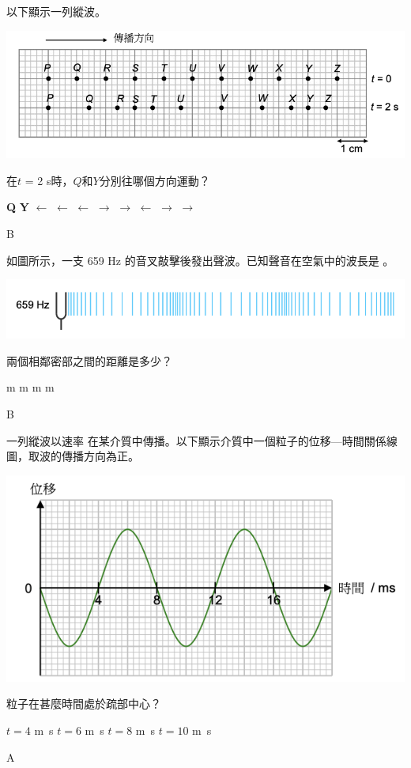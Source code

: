 {
    以下顯示一列縱波。
    \par{\par\centering\includegraphics[width=.6\textwidth]{./img/ch1_earlyclass_wave_mc_2024-05-13-16-17-43.png}\par}
    在$t$ = 2 s時，$Q$和$Y$分別往哪個方向運動？
    \begin{tasks}
        \task [] \textbf{Q} \tab\tab \textbf{Y}
        \task $\leftarrow$ \tab\tab $\leftarrow$
        \task $\leftarrow$ \tab\tab $\rightarrow$
        \task $\rightarrow$ \tab\tab $\leftarrow$
        \task $\rightarrow$ \tab\tab $\rightarrow$
    \end{tasks}
}{B}

{
    如圖所示，一支 659 Hz 的音叉敲擊後發出聲波。已知聲音在空氣中的波長是 。
    \par{\par\centering\includegraphics[width=.6\textwidth]{./img/ch1_earlyclass_wave_mc_2024-05-13-16-20-01.png}\par}
    兩個相鄰密部之間的距離是多少？
    \begin{tasks}
         m
         m
         m
         m
    \end{tasks}

}{B}

{
    一列縱波以速率 在某介質中傳播。以下顯示介質中一個粒子的位移—時間關係線圖，取波的傳播方向為正。
    \par{\par\centering\includegraphics[width=.5\textwidth]{./img/ch1_earlyclass_wave_mc_2024-05-13-16-21-19.png}\par}
    粒子在甚麼時間處於疏部中心？
    \begin{tasks}
        \task $t=4$ \unit{m.s}
        \task $t=6$ \unit{m.s}
        \task $t=8$ \unit{m.s}
        \task $t=10$ \unit{m.s}
    \end{tasks}


}{A}

